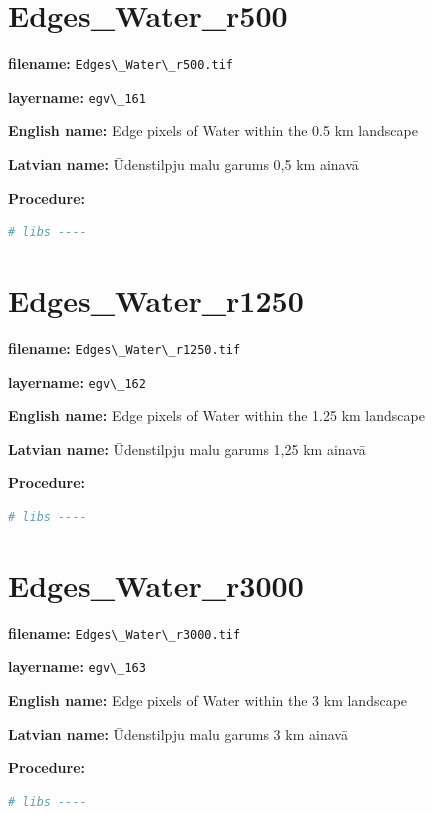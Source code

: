 \documentclass[
]{book}
\newcommand{\passthrough}[1]{#1}
\begin{document}
\section{Edges\_Water\_r500}\label{ch06.161}

\textbf{filename:} \passthrough{\lstinline!Edges\_Water\_r500.tif!}

\textbf{layername:} \passthrough{\lstinline!egv\_161!}

\textbf{English name:} Edge pixels of Water within the 0.5 km landscape

\textbf{Latvian name:} Ūdenstilpju malu garums 0,5 km ainavā

\textbf{Procedure:}

\begin{lstlisting}[language=R]
# libs ----
\end{lstlisting}

\section{Edges\_Water\_r1250}\label{ch06.162}

\textbf{filename:} \passthrough{\lstinline!Edges\_Water\_r1250.tif!}

\textbf{layername:} \passthrough{\lstinline!egv\_162!}

\textbf{English name:} Edge pixels of Water within the 1.25 km landscape

\textbf{Latvian name:} Ūdenstilpju malu garums 1,25 km ainavā

\textbf{Procedure:}

\begin{lstlisting}[language=R]
# libs ----
\end{lstlisting}

\section{Edges\_Water\_r3000}\label{ch06.163}

\textbf{filename:} \passthrough{\lstinline!Edges\_Water\_r3000.tif!}

\textbf{layername:} \passthrough{\lstinline!egv\_163!}

\textbf{English name:} Edge pixels of Water within the 3 km landscape

\textbf{Latvian name:} Ūdenstilpju malu garums 3 km ainavā

\textbf{Procedure:}

\begin{lstlisting}[language=R]
# libs ----
\end{lstlisting}
\end{document}
